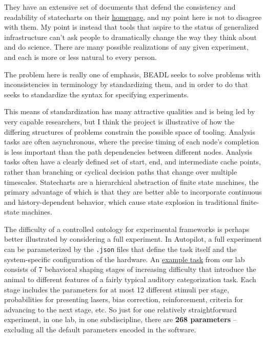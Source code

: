 They have an extensive set of documents that defend the consistency and
readability of statecharts on their
\href{https://statecharts.dev/}{homepage}, and my point here is not to
disagree with them. My point is instead that tools that aspire to the
status of generalized infrastructure can't ask people to dramatically
change the way they think about and do science. There are many possible
realizations of any given experiment, and each is more or less natural
to every person.

The problem here is really one of emphasis, BEADL seeks to solve
problems with inconsistencies in terminology by standardizing them, and
in order to do that seeks to standardize the syntax for specifying
experiments.

This means of standardization has many attractive qualities and is being
led by very capable researchers, but I think the project is illustrative
of how the differing structures of problems constrain the possible space
of tooling. Analysis tasks are often asynchronous, where the precise
timing of each node's completion is less important than the path
dependencies between different nodes. Analysis tasks often have a
clearly defined set of start, end, and intermediate cache points, rather
than branching or cyclical decision paths that change over multiple
timescales. Statecharts are a hierarchical abstraction of finite state
machines, the primary advantage of which is that they are better able to
incorporate continuous and history-dependent behavior, which cause state
explosion in traditional finite-state machines.

The difficulty of a controlled ontology for experimental frameworks is
perhaps better illustrated by considering a full experiment. In
Autopilot, a full experiment can be parameterized by the \texttt{.json}
files that define the task itself and the system-specific configuration
of the hardware. An
\href{https://gist.github.com/sneakers-the-rat/eebe675326a157df49f66f62c4e33a6e}{example
task} from our lab consists of 7 behavioral shaping stages of increasing
difficulty that introduce the animal to different features of a fairly
typical auditory categorization task. Each stage includes the parameters
for at most 12 different stimuli per stage, probabilities for presenting
lasers, bias correction, reinforcement, criteria for advancing to the
next stage, etc. So just for one relatively straightforward experiment,
in one lab, in one subdiscipline, there are \textbf{268 parameters} --
excluding all the default parameters encoded in the software.

